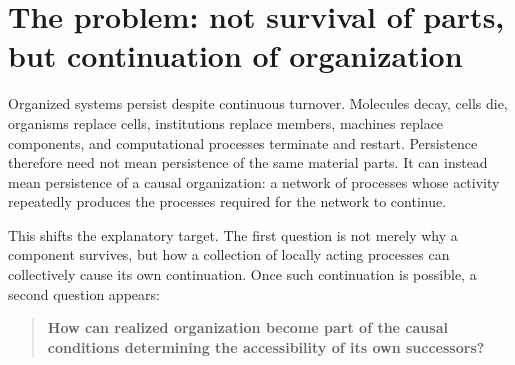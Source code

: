 \documentclass[11pt,a4paper]{article}
\begin{document}
\begin{abstract}
\[
\Omega_\tau
=
\mathbb E\!\left[\int_t^{t+\tau}N(s)\nu(s)\,ds\right]
\]

combines with the conditional variant distribution
\(q(\theta'\mid\theta)\) and establishment probability \(\pi_{\rm est}\)
to determine a successful-successor intensity. The three mechanisms are
mathematically distinct: Mechanism I changes effective persistence
accessibility through basin structure, Mechanism II changes the
inherited starting architecture and the amount of search available, and
Mechanism III changes \(Q\) itself.

The framework implies neither a force toward complexity nor
monotonically increasing accessibility. History may widen, narrow,
fragment, or collapse the set of viable successors. The general claim is
instead: \textbf{existence changes what existence can follow}.
Cumulative organization is the special case in which enough previous
viability is retained that it becomes infrastructure for subsequent
viability, so later viable organization need not repeatedly be
reconstructed from scratch.

\end{abstract}

\section{The problem: not survival of parts, but continuation of
organization}\label{the-problem-not-survival-of-parts-but-continuation-of-organization}

Organized systems persist despite continuous turnover. Molecules decay,
cells die, organisms replace cells, institutions replace members,
machines replace components, and computational processes terminate and
restart. Persistence therefore need not mean persistence of the same
material parts. It can instead mean persistence of a causal
organization: a network of processes whose activity repeatedly produces
the processes required for the network to continue.

This shifts the explanatory target. The first question is not merely why
a component survives, but how a collection of locally acting processes
can collectively cause its own continuation. Once such continuation is
possible, a second question appears:

\begin{quote}
\textbf{How can realized organization become part of the causal
conditions determining the accessibility of its own successors?}
\end{quote}
\end{document}
